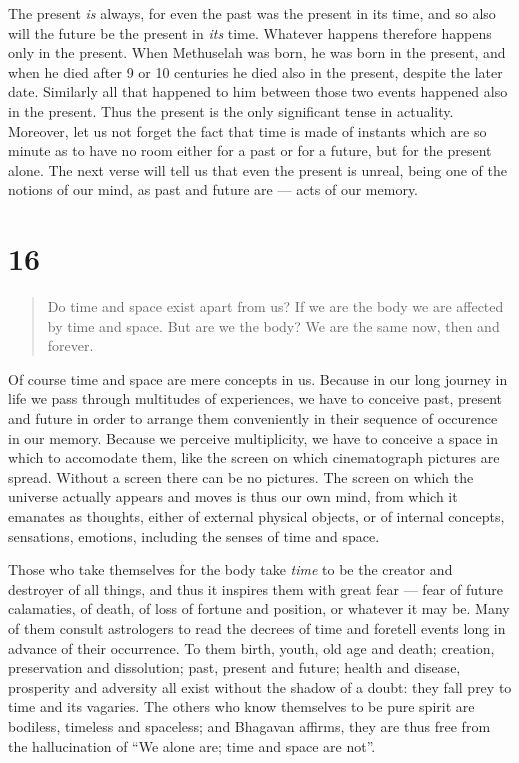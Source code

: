 \documentclass[12pt]{report}
\begin{document}
The present \emph{is} always, for even the past was the present in its
time, and so also will the future be the present in \emph{its}
time. Whatever happens therefore happens only in the present. When
Methuselah was born, he was born in the present, and when he died
after 9 or 10 centuries he died also in the present, despite the later
date. Similarly all that happened to him between those two events
happened also in the present. Thus the present is the only significant
tense in actuality. Moreover, let us not forget the fact that time is
made of instants which are so minute as to have no room either for a
past or for a future, but for the present alone. The next verse will
tell us that even the present is unreal, being one of the notions of
our mind, as past and future are --- acts of our memory.


\section{16}

\begin{quote}
Do time and space exist apart from us? If we are the body we are
affected by time and space. But are we the body? We are the same now,
then and forever.
\end{quote}


Of course time and space are mere concepts in us. Because in our long
journey in life we pass through multitudes of experiences, we have to
conceive past, present and future in order to arrange them
conveniently in their sequence of occurence in our memory. Because we
perceive multiplicity, we have to conceive a space in which to
accomodate them, like the screen on which cinematograph pictures are
spread. Without a screen there can be no pictures. The screen on which
the universe actually appears and moves is thus our own mind, from
which it emanates as thoughts, either of external physical objects, or
of internal concepts, sensations, emotions, including the senses of
time and space. 

Those who take themselves for the body take \emph{time} to be the
creator and destroyer of all things, and thus it inspires them with
great fear --- fear of future calamaties, of death, of loss of fortune
and position, or whatever it may be. Many of them consult astrologers
to read the decrees of time and foretell events long in advance of
their occurrence. To them birth, youth, old age and death; creation,
preservation and dissolution; past, present and future; health and
disease, prosperity and adversity all exist without the shadow of a
doubt: they fall prey to time and its vagaries. The others who know
themselves to be pure spirit are bodiless, timeless and spaceless; and
Bhagavan affirms, they are thus free from the hallucination of ``We
alone are; time and space are not''.
\end{document}
